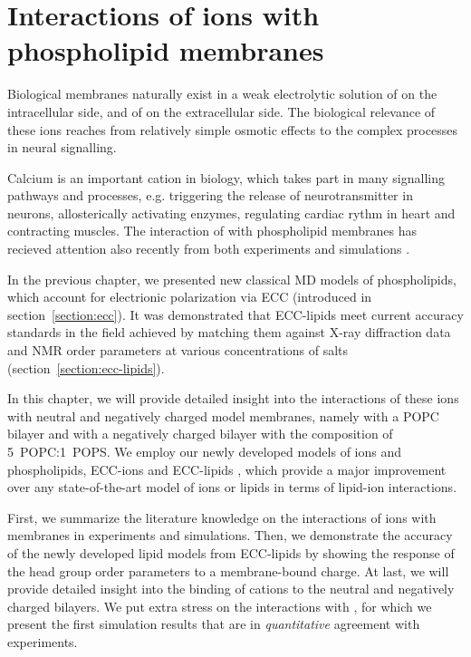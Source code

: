\chapter{Interactions of ions with phospholipid membranes}
\label{chap:results}

Biological membranes naturally exist in a weak electrolytic solution of  on the intracellular side, and of  on the extracellular side. 
The biological relevance of these ions reaches from relatively simple osmotic effects to the complex processes in neural signalling. 

Calcium is an important cation in biology, 
which takes part in many signalling pathways and processes, 
e.g. triggering the release of neurotransmitter in neurons, allosterically activating enzymes, 
regulating cardiac rythm in heart and contracting muscles. \citep{Wang2000, Michalak2002, Glancy2013, Chouhan2012, Berridge2003, Clapham2007, Annunziata2013}
The interaction of  with phospholipid membranes has recieved attention also recently from both experiments and simulations \citep{melcrova16, javanainen17, catte16, melcr18, magarkar2017}.

In the previous chapter, we presented new classical MD models of phospholipids,
which account for electrionic polarization via ECC (introduced in section~\ref{section:ecc}). 
It was demonstrated that ECC-lipids 
meet current accuracy standards in the field 
achieved by matching them against X-ray diffraction data and 
NMR order parameters at various concentrations of salts (section~\ref{section:ecc-lipids}). 


In this chapter, we will provide detailed insight into the interactions of these ions with neutral and negatively charged model membranes,
namely with a POPC bilayer and with a negatively charged bilayer with the composition of 5~POPC:1~POPS. 
We employ our newly developed models of ions and phospholipids, 
ECC-ions \citep{martinek17, kohagen16, Pluharova2014} and ECC-lipids \citep{melcr18}, 
which provide a major improvement over any state-of-the-art model of ions or lipids in terms of lipid-ion interactions. 

First, we summarize the literature knowledge on the interactions of ions with membranes in experiments and simulations.
Then, we demonstrate the accuracy of the newly developed lipid models from ECC-lipids
by showing the response of the head group order parameters to a membrane-bound charge.
At last, we will provide detailed insight into the binding of cations to the neutral and negatively charged bilayers. 
We put extra stress on the interactions with , 
for which we present the first simulation results that are in \emph{quantitative} agreement with experiments. \citep{catte16, melcr18}






